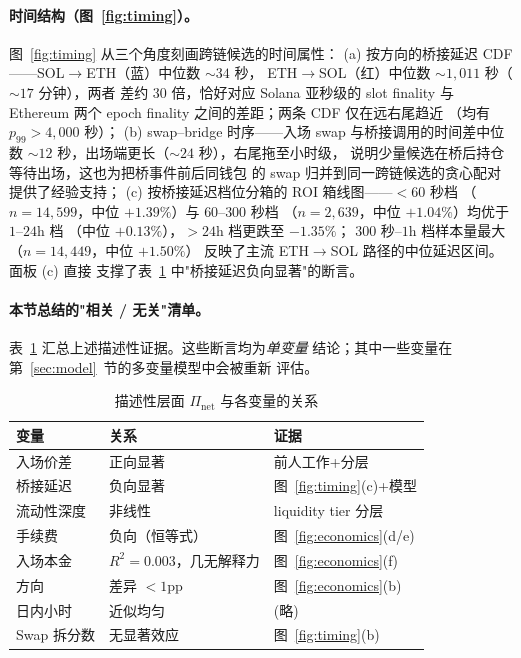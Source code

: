 \documentclass[sigconf,nonacm,10pt]{acmart}
\newcommand{\Pnet}{\Pi_{\text{net}}}
\begin{document}
\paragraph{时间结构（图~\ref{fig:timing}）。} 图~\ref{fig:timing}
从三个角度刻画跨链候选的时间属性：
(a) 按方向的桥接延迟 CDF——SOL$\to$ETH（蓝）中位数 $\sim\!34$ 秒，
ETH$\to$SOL（红）中位数 $\sim\!1{,}011$ 秒（$\sim\!17$ 分钟），两者
差约 $30$ 倍，恰好对应 Solana 亚秒级的 slot finality 与 Ethereum
两个 epoch finality 之间的差距；两条 CDF 仅在远右尾趋近
（均有 $p_{99}\!>\!4{,}000$ 秒）；
(b) swap--bridge 时序——入场 swap 与桥接调用的时间差中位数
$\sim\!12$ 秒，出场端更长（$\sim\!24$ 秒），右尾拖至小时级，
说明少量候选在桥后持仓等待出场，这也为把桥事件前后同钱包
的 swap 归并到同一跨链候选的贪心配对提供了经验支持；
(c) 按桥接延迟档位分箱的 ROI 箱线图——$<\!60$ 秒档
（$n=14{,}599$，中位 $+1.39\%$）与 $60$--$300$ 秒档
（$n=2{,}639$，中位 $+1.04\%$）均优于 $1$--$24$h 档
（中位 $+0.13\%$），$>\!24$h 档更跌至 $-1.35\%$；
$300$ 秒--$1$h 档样本量最大（$n=14{,}449$，中位 $+1.50\%$）
反映了主流 ETH$\to$SOL 路径的中位延迟区间。面板 (c) 直接
支撑了表~\ref{tab:univar} 中"桥接延迟负向显著"的断言。

\paragraph{本节总结的"相关 / 无关"清单。}
表~\ref{tab:univar} 汇总上述描述性证据。这些断言均为\emph{单变量}
结论；其中一些变量在第~\ref{sec:model}~节的多变量模型中会被重新
评估。

\begin{table}[h]
  \centering
  \small
  \caption{描述性层面 $\Pnet$ 与各变量的关系}
  \label{tab:univar}
  \begin{tabular}{lll}
    \toprule
    \textbf{变量} & \textbf{关系} & \textbf{证据} \\
    \midrule
    入场价差 & 正向显著 & 前人工作+分层 \\
    桥接延迟 & 负向显著 & 图~\ref{fig:timing}(c)+模型 \\
    流动性深度 & 非线性 & liquidity tier 分层 \\
    手续费  & 负向（恒等式） & 图~\ref{fig:economics}(d/e) \\
    入场本金 & $R^2=0.003$，几无解释力 & 图~\ref{fig:economics}(f) \\
    方向 & 差异 $<\!1$pp & 图~\ref{fig:economics}(b) \\
    日内小时 & 近似均匀 & (略) \\
    Swap 拆分数 & 无显著效应 & 图~\ref{fig:timing}(b) \\
    \bottomrule
  \end{tabular}
\end{table}
\end{document}
